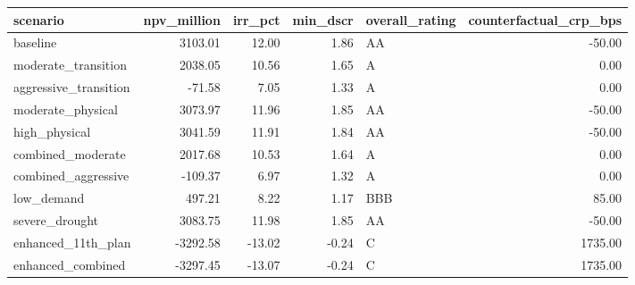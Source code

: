 \begin{tabular}{lrrrlr}
\toprule
scenario & npv_million & irr_pct & min_dscr & overall_rating & counterfactual_crp_bps \\
\midrule
baseline & 3103.01 & 12.00 & 1.86 & AA & -50.00 \\
moderate_transition & 2038.05 & 10.56 & 1.65 & A & 0.00 \\
aggressive_transition & -71.58 & 7.05 & 1.33 & A & 0.00 \\
moderate_physical & 3073.97 & 11.96 & 1.85 & AA & -50.00 \\
high_physical & 3041.59 & 11.91 & 1.84 & AA & -50.00 \\
combined_moderate & 2017.68 & 10.53 & 1.64 & A & 0.00 \\
combined_aggressive & -109.37 & 6.97 & 1.32 & A & 0.00 \\
low_demand & 497.21 & 8.22 & 1.17 & BBB & 85.00 \\
severe_drought & 3083.75 & 11.98 & 1.85 & AA & -50.00 \\
enhanced_11th_plan & -3292.58 & -13.02 & -0.24 & C & 1735.00 \\
enhanced_combined & -3297.45 & -13.07 & -0.24 & C & 1735.00 \\
\bottomrule
\end{tabular}
